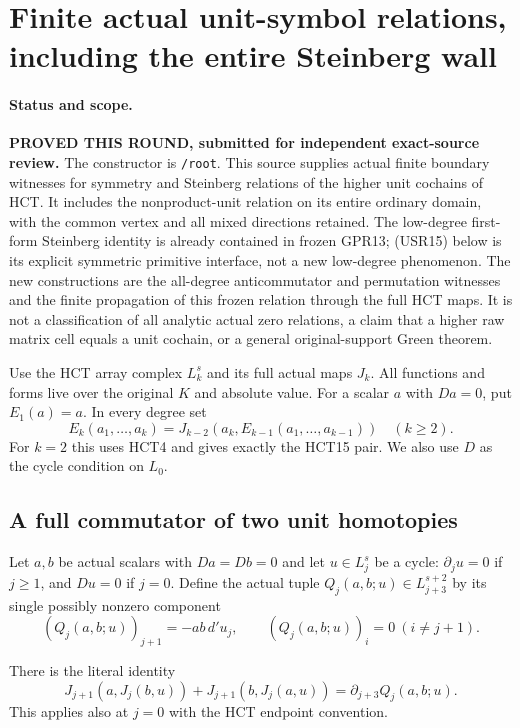 \section{Finite actual unit-symbol relations, including the entire Steinberg wall}
\label{sec:r12-actual-unit-symbol-relations}

\paragraph{Status and scope.}
\textbf{PROVED THIS ROUND, submitted for independent exact-source review.}
The constructor is \texttt{/root}.  This source supplies actual finite
boundary witnesses for symmetry and Steinberg relations of the higher
unit cochains of HCT.  It includes the nonproduct-unit relation on its
entire ordinary domain, with the common vertex and all mixed directions
retained.  The low-degree first-form Steinberg identity is already
contained in frozen GPR13; (USR15) below is its explicit symmetric
primitive interface, not a new low-degree phenomenon.  The new
constructions are the all-degree anticommutator and permutation
witnesses and the finite propagation of this frozen relation through
the full HCT maps.  It is not a classification of all analytic actual zero
relations, a claim that a higher raw matrix cell equals a unit cochain,
or a general original-support Green theorem.

Use the HCT array complex $L_k^s$ and its full actual maps $J_k$.
All functions and forms live over the original $K$ and absolute value.
For a scalar $a$ with $Da=0$, put $E_1(a)=a$.  In every degree set
\[
 E_k(a_1,\ldots,a_k)
      =J_{k-2}(a_k,E_{k-1}(a_1,\ldots,a_{k-1}))\quad(k\ge2).
 \tag{USR1}
\]
For $k=2$ this uses HCT4 and gives exactly the HCT15 pair.
We also use $D$ as the cycle condition on $L_0$.

\subsection{A full commutator of two unit homotopies}

Let $a,b$ be actual scalars with $Da=Db=0$ and let
$u\in L_j^s$ be a cycle: $\partial_j u=0$ if $j\ge1$, and
$Du=0$ if $j=0$.  Define the actual tuple
$Q_j(a,b;u)\in L_{j+3}^{s+2}$ by its single possibly nonzero
component
\[
      (Q_j(a,b;u))_{j+1}=-ab\,d'u_j,
                  \qquad (Q_j(a,b;u))_i=0\ (i\ne j+1).
 \tag{USR2}
\]

\begin{lemma}
There is the literal identity
\[
 J_{j+1}(a,J_j(b,u))+J_{j+1}(b,J_j(a,u))
                         =\partial_{j+3}Q_j(a,b;u).
 \tag{USR3}
\]
This applies also at $j=0$ with the HCT endpoint convention.
\end{lemma}

